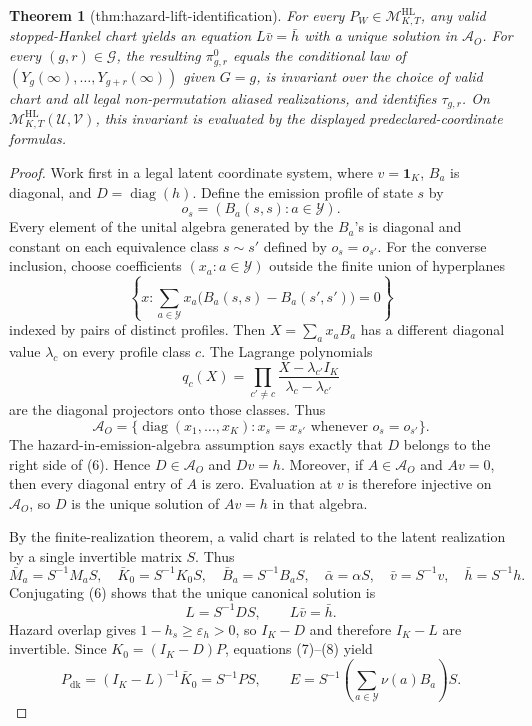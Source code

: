 \documentclass{article}
\newtheorem{theorem}{Theorem}
\begin{document}
\begin{theorem}[thm:hazard-lift-identification]\label{thm:hazard-lift-identification}
For every \(P_W\in\mathcal M^{\mathrm{HL}}_{K,T}\), any valid stopped-Hankel chart yields an equation \(L\bar v=\bar h\) with a unique solution in \(\mathcal A_O\). For every \((g,r)\in\mathcal G\), the resulting \(\pi^0_{g,r}\) equals the conditional law of \((Y_g(\infty),\ldots,Y_{g+r}(\infty))\) given \(G=g\), is invariant over the choice of valid chart and all legal non-permutation aliased realizations, and identifies \(\tau_{g,r}\). On \(\mathcal M^{\mathrm{HL}}_{K,T}(\mathcal U,\mathcal V)\), this invariant is evaluated by the displayed predeclared-coordinate formulas.
\end{theorem}
\begin{proof}
Work first in a legal latent coordinate system, where \(v=\mathbf 1_K\), \(B_a\) is diagonal, and \(D=\operatorname{diag}(h)\).  Define the emission profile of state \(s\) by
\[
 o_s=(B_a(s,s):a\in\mathcal Y).
\]
Every element of the unital algebra generated by the \(B_a\)'s is diagonal and constant on each equivalence class \(s\sim s'\) defined by \(o_s=o_{s'}\).  For the converse inclusion, choose coefficients \((x_a:a\in\mathcal Y)\) outside the finite union of hyperplanes
\[
 \left\{x:\sum_{a\in\mathcal Y}x_a\bigl(B_a(s,s)-B_a(s',s')\bigr)=0\right\}
\]
indexed by pairs of distinct profiles.  Then \(X=\sum_a x_aB_a\) has a different diagonal value \(\lambda_c\) on every profile class \(c\).  The Lagrange polynomials
\[
 q_c(X)=\prod_{c'\ne c}\frac{X-\lambda_{c'}I_K}{\lambda_c-\lambda_{c'}}
\]
are the diagonal projectors onto those classes.  Thus
\[
 \mathcal A_O
 =\{\operatorname{diag}(x_1,\ldots,x_K):x_s=x_{s'}\text{ whenever }o_s=o_{s'}\}.       \tag{6}
\]
The hazard-in-emission-algebra assumption says exactly that \(D\) belongs to the right side of (6).  Hence \(D\in\mathcal A_O\) and \(Dv=h\).  Moreover, if \(A\in\mathcal A_O\) and \(Av=0\), then every diagonal entry of \(A\) is zero.  Evaluation at \(v\) is therefore injective on \(\mathcal A_O\), so \(D\) is the unique solution of \(Av=h\) in that algebra.

By the finite-realization theorem, a valid chart is related to the latent realization by a single invertible matrix \(S\).  Thus
\[
 \bar M_a=S^{-1}M_aS,
 \quad \bar K_0=S^{-1}K_0S,
 \quad \bar B_a=S^{-1}B_aS,
 \quad \bar\alpha=\alpha S,
 \quad \bar v=S^{-1}v,
 \quad \bar h=S^{-1}h.                                        \tag{7}
\]
Conjugating (6) shows that the unique canonical solution is
\[
 L=S^{-1}DS,
 \qquad L\bar v=\bar h.                                      \tag{8}
\]
Hazard overlap gives \(1-h_s\ge\varepsilon_h>0\), so \(I_K-D\) and therefore \(I_K-L\) are invertible.  Since \(K_0=(I_K-D)P\), equations (7)--(8) yield
\[
 P_{\mathrm{dk}}=(I_K-L)^{-1}\bar K_0=S^{-1}PS,
 \qquad
 E=S^{-1}\left(\sum_{a\in\mathcal Y}\nu(a)B_a\right)S.     \tag{9}
\]


\end{proof}
\end{document}
